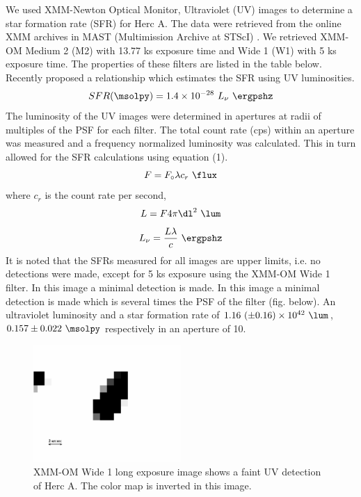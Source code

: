 \documentclass[12pt, preprint]{aastex}
\begin{document}
We used XMM-Newton Optical Monitor, Ultraviolet (UV) images to
determine a star formation rate (SFR) for Herc A. The data were
retrieved from the online XMM archives in MAST (Multimission Archive
at STScI) . We retrieved XMM-OM Medium 2 (M2) with 13.77 ks exposure
time and Wide 1 (W1) with 5 ks exposure time. The properties of these
filters are listed in the table below. Recently \citet{salim2007}
proposed a relationship which estimates the SFR using UV luminosities.
\begin{equation}
  SFR(\msolpy) = 1.4 \times 10^{-28} ~L_{\nu} ~\ergpshz
\end{equation}
The luminosity of the UV images were determined in apertures at radii
of multiples of the PSF for each filter. The total count rate (cps)
within an aperture was measured and a frequency normalized luminosity
was calculated. This in turn allowed for the SFR calculations using
equation (1).
\begin{equation}
  F = F_{\circ} \lambda c_r ~\flux
\end{equation}
where $c_r$ is the count rate per second,
\begin{equation}
  L = F 4\pi \dl^2 ~\lum
\end{equation}
\begin{equation}
  L_{\nu} = \frac{L \lambda}{c} ~\ergpshz
\end{equation}
It is noted that the SFRs measured for all images are upper limits,
i.e. no detections were made, except for 5 ks exposure using the
XMM-OM Wide 1 filter. In this image a minimal detection is made. In
this image a minimal detection is made which is several times the PSF
of the filter (fig. below). An ultraviolet luminosity and a star
formation rate of $1.16 ~(\pm 0.16) \times 10^{42} ~\lum$, $0.157 \pm
0.022 ~\msolpy$ respectively in an aperture of 10\arcs.

\begin{figure}[h]
  \begin{center}
    \includegraphics[width=0.5\textwidth]{xmmw1.eps}
    \caption{XMM-OM Wide 1 long exposure image shows a faint UV detection
      of Herc A. The color map is inverted in this image.}
  \end{center}
\end{figure}
\end{document}
